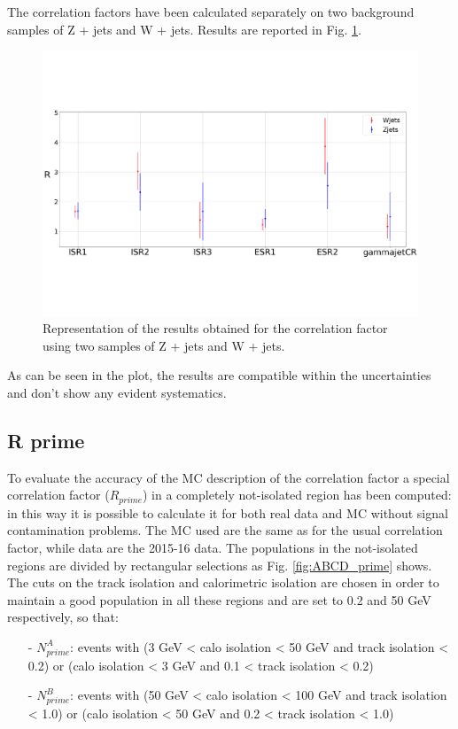 \documentclass[11pt,a4paper,twoside,openright]{book}
\begin{document}
The correlation factors have been calculated separately on two background samples of Z + jets and W + jets. Results are reported in Fig. \ref{fig:R_MC}.


\begin{figure}[hbtp!]
    \centering
    \includegraphics[width=12cm]{R_MC.pdf}
    \caption{Representation of the results obtained for the correlation factor using two samples of Z + jets and W + jets.}
    \label{fig:R_MC}
\end{figure}


As can be seen in the plot, the results are compatible within the uncertainties and don't show any evident systematics.



\subsection{R prime}

To evaluate the accuracy of the MC description of the correlation factor a special correlation factor ($R_{prime}$) in a completely not-isolated region has been computed: in this way it is possible to calculate it for both real data and MC without signal contamination problems. The MC used are the same as for the usual correlation factor, while data are the 2015-16 data. 
The populations in the not-isolated regions are divided by rectangular selections as Fig. \ref{fig:ABCD_prime} shows. The cuts on the track isolation and calorimetric isolation are chosen in order to maintain a good population in all these regions and are set to 0.2 and 50 GeV respectively, so that:

\begin{itemize}
    \item[-] $N^{A}_{prime}$: events with (3 GeV < calo isolation < 50 GeV and track isolation < 0.2) or (calo isolation < 3 GeV and 0.1 < track isolation < 0.2)
    \item[-] $N^{B}_{prime}$: events with (50 GeV < calo isolation < 100 GeV and track isolation < 1.0) or (calo isolation < 50 GeV and 0.2 < track isolation < 1.0)
\end{itemize}
\end{document}
